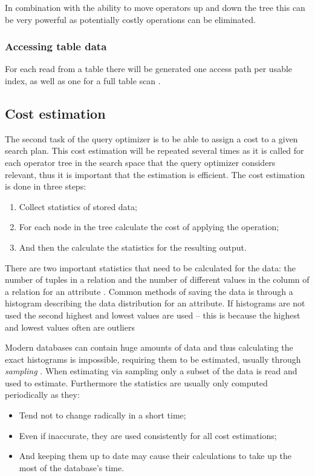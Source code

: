 In combination with the ability to move operators up and down the tree this can be very powerful as potentially costly operations can be eliminated.

\subsubsection{Accessing table data}
For each read from a table there will be generated one access path per usable index, as well as one for a full table scan \cite[p. 827-829]{garcia-molina_2002_database_dstcb}.

\subsection{Cost estimation}
The second task of the query optimizer is to be able to assign a cost to a given search plan. This cost estimation will be repeated several times as it is called for each operator tree in the search space that the query optimizer considers relevant, thus it is important that the estimation is efficient. The cost estimation is done in three steps:
\begin{enumerate}
    \item Collect statistics of stored data;
    \item For each node in the tree calculate the cost of applying the operation;
    \item And then the calculate the statistics for the resulting output.
\end{enumerate}

There are two important statistics that need to be calculated for the data: the number of tuples in a relation and the number of different values in the column of a relation for an attribute \cite[p. 807-808]{garcia-molina_2002_database_dstcb}. Common methods of saving the data is through a histogram describing the data distribution for an attribute. If histograms are not used the second highest and lowest values are used – this is because the highest and lowest values often are outliers

Modern databases can contain huge amounts of data and thus calculating the exact histograms is impossible, requiring them to be estimated, usually through \textit{sampling} \cite[p. 807-808]{garcia-molina_2002_database_dstcb}. When estimating via sampling only a subset of the data is read and used to estimate. Furthermore the statistics are usually only computed periodically as they:
\begin{itemize}
    \item Tend not to change radically in a short time;
    \item Even if inaccurate, they are used consistently for all cost estimations;
    \item And keeping them up to date may cause their calculations to take up the most of the database's time.
\end{itemize}

